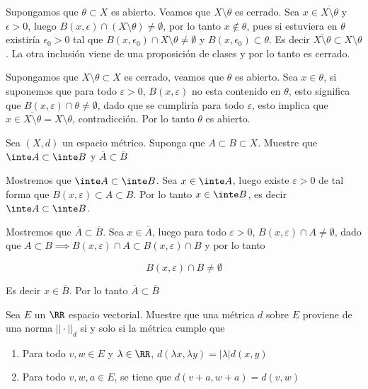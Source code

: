 \documentclass[a4paper,oneside,10.5pt]{USMArt}
\begin{document}
\begin{sol}
  Supongamos que $\theta \subset X$ es abierto. Veamos que $X \setminus \theta$ es cerrado. Sea $x \in \overline{X \setminus \theta}$ y $\epsilon > 0$, luego $B(x, \epsilon) \cap (X \setminus \theta) \neq \emptyset$, por lo tanto $x \notin \theta$, pues si estuviera en $\theta$ existiría $\epsilon_{0} > 0$ tal que $B(x, \epsilon_{0}) \cap X \setminus \theta \neq \emptyset$ y $B(x, \epsilon_{0}) \subset \theta$. Es decir $\overline{X \setminus \theta} \subset X \setminus \theta$. La otra inclusión viene de una proposición de clases y por lo tanto es cerrado.
  \newline

  Supongamos que $X \setminus \theta \subset X$ es cerrado, veamos que $\theta$ es abierto. Sea $x \in \theta$, si suponemos que para todo $\varepsilon > 0$, $B(x, \varepsilon)$ no esta contenido en $\theta$, esto significa que $B(x, \varepsilon) \cap \theta \neq \emptyset$, dado que se cumpliría para todo $\varepsilon$, esto implica que $x \in \overline{X \setminus \theta} = X \setminus \theta$, contradicción.
  Por lo tanto $\theta$ es abierto.
\end{sol}

\begin{prob}
  Sea $(X, d)$ un espacio métrico. Suponga que $A \subset B \subset X$. Muestre que
  $\inte A \subset \inte B$ y $\overline{A} \subset \overline{B}$
\end{prob}

%
\begin{sol}
  Mostremos que $\inte A \subset \inte B$.
  Sea $x \in \inte A$, luego existe $\varepsilon > 0$ de tal forma que $B(x, \varepsilon) \subset A \subset B$.
  Por lo tanto $x \in \inte B$, es decir $\inte A \subset \inte B$.
  \newline

  Mostremos que $\overline{A} \subset \overline{B}$.
  Sea $x \in \overline{A}$, luego para todo $\varepsilon > 0$, $B(x, \varepsilon) \cap A \neq \emptyset$,
  dado que $A \subset B \implies B(x, \varepsilon) \cap A \subset B(x, \varepsilon) \cap B$ y por lo tanto

  \begin{equation*}
    B(x, \varepsilon) \cap B \neq \emptyset
  \end{equation*}

  Es decir $x \in \overline{B}$. Por lo tanto $\overline{A} \subset \overline{B}$
\end{sol}

\begin{prob}
  Sea $E$ un $\RR$ espacio vectorial. Muestre que una métrica $d$ sobre $E$ proviene de una norma $|| \cdot ||_{d}$ si y solo si la métrica cumple que
  \begin{enumerate}
    \item Para todo $v, w \in E$ y $\lambda \in \RR$, $d(\lambda x, \lambda y) = |\lambda| d(x, y)$
    \item Para todo $v, w, a \in E$, se tiene que $d(v + a, w + a) = d(v, w)$
  \end{enumerate}
\end{prob}
\end{document}
